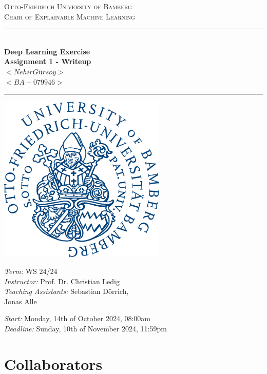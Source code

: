 \documentclass[12pt,twoside]{article}
\begin{document}
\begin{titlepage}

\newcommand{\HRule}{\rule{\linewidth}{0.5mm}} %
\newcommand{\hRule}{\rule{0.6\linewidth}{0.25mm}} %

\begin{center} %
    \textsc{\Large Otto-Friedrich University of Bamberg}\\[0.5cm] 
    \textsc{\large Chair of Explainable Machine Learning}\\[1.5cm] 

    \HRule \\[0.4cm]
    {\huge \bfseries Deep Learning Exercise}\\[0.5cm] 
    {\LARGE \bfseries Assignment 1 - Writeup}\\[0.5cm]
    {\large \bfseries $<Nehir Gürsoy>$}\\[0.5cm] %
    {\large \bfseries $<BA-079946>$} %
    \HRule
    
\end{center}

\vfill

\begin{center}
    \includegraphics[width = 8cm]{img/uni_bamberg_logo.pdf}
\end{center}

\vfill
\begin{flushleft} \large
    \textit{Term:} WS 24/24 \\
    \textit{Instructor:} Prof. Dr. Christian Ledig \\
    \textit{Teaching Assistants:} Sebastian Dörrich, \\
     Jonas Alle
    
    \vspace{0.5cm}
    
    \textit{Start:} Monday, 14th of October 2024, 08:00am\\
    \textit{Deadline:} Sunday, 10th of November 2024, 11:59pm
    
\end{flushleft}
\vfill %

\end{titlepage}

\section*{Collaborators}

\newpage
\end{document}
